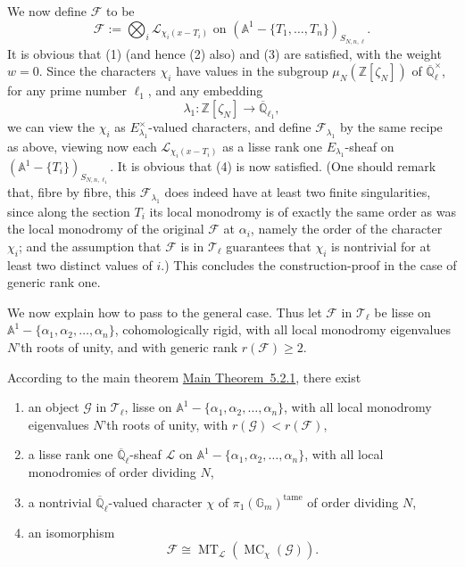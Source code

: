 We now define \(\mathcal{F}\) to be
\[
  \mathcal{F}:=
  \bigotimes_i\mathcal{L}_{\chi_i(x-T_i)}
  \text{ on }(\mathbb{A}^1-\{T_1,\ldots,T_n\})_{S_{N,n,\ell}}.
\]
It is obvious that (1) (and hence (2) also) and (3) are satisfied, with the
weight \(w=0\). Since the characters \(\chi_i\) have values in the subgroup
\(\mu_N(\mathbb{Z}[\zeta_N])\) of
\(\overline{\mathbb{Q}}_\ell^\times\), for any prime number \(\ell_1\), and
any embedding
\[
  \lambda_1:\mathbb{Z}[\zeta_N]\to\overline{\mathbb{Q}}_{\ell_1},
\]
we can view the \(\chi_i\) as \(E_{\lambda_1}^\times\)-valued characters, and
define \(\mathcal{F}_{\lambda_1}\) by the same recipe as above, viewing now
each \(\mathcal{L}_{\chi_i(x-T_i)}\) as a lisse rank one
\(E_{\lambda_1}\)-sheaf on
\((\mathbb{A}^1-\{T_i\})_{S_{N,n,\ell_1}}\). It is obvious that (4) is now
satisfied. (One should remark that, fibre by fibre, this
\(\mathcal{F}_{\lambda_1}\) does indeed have at least two finite singularities,
since along the section \(T_i\) its local monodromy is of exactly the same
order as was the local monodromy of the original \(\mathcal{F}\) at
\(\alpha_i\), namely the order of the character \(\chi_i\); and the assumption
that \(\mathcal{F}\) is in \(\mathcal{T}_\ell\) guarantees that \(\chi_i\) is
nontrivial for at least two distinct values of \(i\).) This concludes the
construction-proof in the case of generic rank one.

We now explain how to pass to the general case. Thus let \(\mathcal{F}\) in
\(\mathcal{T}_\ell\) be lisse on
\(\mathbb{A}^1-\{\alpha_1,\alpha_2,\ldots,\alpha_n\}\), cohomologically rigid,
with all local monodromy eigenvalues \(N\)'th roots of unity, and with generic
rank \(r(\mathcal{F})\geq 2\).

According to the main theorem \hyperref[thm:5.2.1]{Main Theorem~5.2.1}, there
exist
\begin{enumerate}[label=(\arabic*)]
\item an object \(\mathcal{G}\) in \(\mathcal{T}_\ell\), lisse on
\(\mathbb{A}^1-\{\alpha_1,\alpha_2,\ldots,\alpha_n\}\), with all local
monodromy eigenvalues \(N\)'th roots of unity, with
\(r(\mathcal{G})<r(\mathcal{F})\),

\item a lisse rank one \(\overline{\mathbb{Q}}_\ell\)-sheaf \(\mathcal{L}\) on
\(\mathbb{A}^1-\{\alpha_1,\alpha_2,\ldots,\alpha_n\}\), with all local
monodromies of order dividing \(N\),

\item a nontrivial \(\overline{\mathbb{Q}}_\ell\)-valued character \(\chi\) of
\(\pi_1(\mathbb{G}_m)^{\mathrm{tame}}\) of order dividing \(N\),

\item an isomorphism
\[
  \mathcal{F}\cong\operatorname{MT}_{\mathcal{L}}(\operatorname{MC}_\chi(\mathcal{G})).
\]
\end{enumerate}

